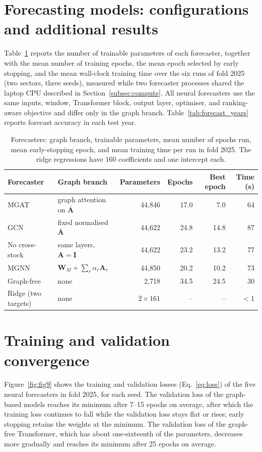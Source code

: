 \section{Forecasting models: configurations and additional results}
\label{app:model_complexity}

{\color{blue}Table~\ref{tab:param_count} reports the number of trainable parameters of each forecaster, together with the mean number of training epochs, the mean epoch selected by early stopping, and the mean wall-clock training time over the six runs of fold 2025 (two sectors, three seeds), measured while two forecaster processes shared the laptop CPU described in Section~\ref{subsec:compute}. All neural forecasters use the same inputs, window, Transformer block, output layer, optimiser, and ranking-aware objective and differ only in the graph branch. Table~\ref{tab:forecast_years} reports forecast accuracy in each test year.\par}

\begin{table}[!h]
\centering\small
\color{blue}
\caption{Forecasters: graph branch, trainable parameters, mean number of epochs run, mean early-stopping epoch, and mean training time per run in fold 2025. The ridge regressions have $160$ coefficients and one intercept each.}
\label{tab:param_count}
\setlength{\tabcolsep}{4pt}
\begin{tabular}{llrrrr}
\toprule
Forecaster & Graph branch & Parameters & Epochs & Best epoch & Time (s) \\
\midrule
MGAT & graph attention on $\bar{\mathbf{A}}$ & 44{,}846 & 17.0 & 7.0 & 64 \\
GCN & fixed normalised $\bar{\mathbf{A}}$ & 44{,}622 & 24.8 & 14.8 & 87 \\
No cross-stock & same layers, $\mathbf{A}=\mathbf{I}$ & 44{,}622 & 23.2 & 13.2 & 77 \\
MGNN & $\mathbf{W}_M+\sum_r\alpha_r\mathbf{A}_r$ & 44{,}850 & 20.2 & 10.2 & 73 \\
Graph-free & none & 2{,}718 & 34.5 & 24.5 & 30 \\
Ridge (two targets) & none & $2\times161$ & -- & -- & $<$1 \\
\bottomrule
\end{tabular}
\end{table}


\FloatBarrier

\section{Training and validation convergence}
\label{app:convergence}
{\color{blue}Figure~\ref{fig:fig9} shows the training and validation losses (Eq.~\eqref{eq:loss}) of the five neural forecasters in fold 2025, for each seed. The validation loss of the graph-based models reaches its minimum after 7--15 epochs on average, after which the training loss continues to fall while the validation loss stays flat or rises; early stopping retains the weights at the minimum. The validation loss of the graph-free Transformer, which has about one-sixteenth of the parameters, decreases more gradually and reaches its minimum after 25 epochs on average.\par}

